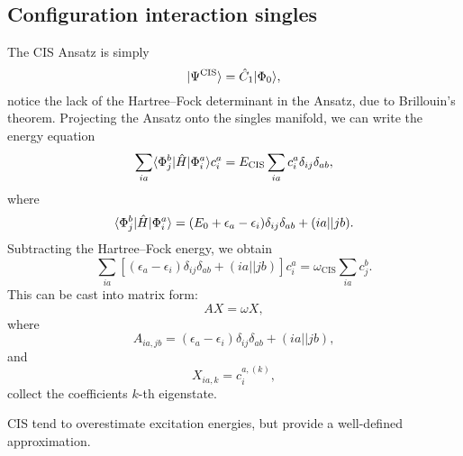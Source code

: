 \documentclass{article}
\begin{document}
\subsection{Configuration interaction singles}
The CIS Ansatz is simply \cite{dreuwSingleReferenceInitioMethods2005}
\begin{equation}
    |\Psi^{\mathrm{CIS}}\rangle=\hat{C}_1|\Phi_0\rangle,
\end{equation}
notice the lack of the Hartree--Fock determinant in the Ansatz, due to Brillouin's theorem. Projecting the Ansatz onto the singles manifold, we can write the energy equation
\begin{equation}
\sum_{ia}\langle \Phi_j^b|\hat{H}|\Phi_i^a\rangle c_i^a=E_{\mathrm{CIS}}\sum_{ia}c_i^a\delta_{ij}\delta_{ab},
\end{equation}
where
\begin{equation}
    \langle \Phi_j^b|\hat{H}|\Phi_i^a\rangle=(E_0+\epsilon_a-\epsilon_i)\delta_{ij}\delta_{ab}+ (ia||jb).
\end{equation}
Subtracting the Hartree--Fock energy, we obtain
\begin{equation}
\sum_{ia}[(\epsilon_a-\epsilon_i)\delta_{ij}\delta_{ab}+ (ia||jb)]c_i^a=\omega_{\mathrm{CIS}}\sum_{ia}c_j^b.
\end{equation}
This can be cast into matrix form:
\begin{equation}
AX=\omega X,
\end{equation}
where
\begin{equation}
A_{ia,jb}=(\epsilon_a-\epsilon_i)\delta_{ij}\delta_{ab}+ (ia||jb),
\end{equation}
and
\begin{equation}
    X_{ia,k}=c_i^{a,(k)},
\end{equation}
collect the coefficients $k$-th eigenstate.

CIS tend to overestimate excitation energies, but provide a well-defined approximation.
\end{document}
